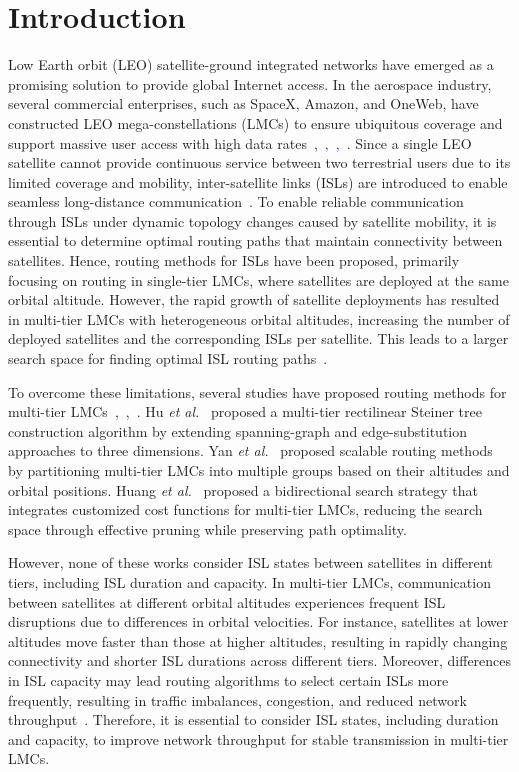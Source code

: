\section{Introduction}\label{sec:introduction}
Low Earth orbit (LEO) satellite-ground integrated networks have emerged as a promising solution to provide global Internet access. In the aerospace industry, several commercial enterprises, such as SpaceX, Amazon, and OneWeb, have constructed LEO mega-constellations (LMCs) to ensure ubiquitous coverage and support massive user access with high data rates~\cite{wang2022mega},~\cite{cao2025dense}\textcolor{blue}{,~\cite{he2024direct},~\cite{he2022multi}}.
Since a single LEO satellite cannot provide continuous service between two terrestrial users due to its limited coverage and mobility, inter-satellite links (ISLs) are introduced to enable seamless long-distance communication~\cite{mao2024intelligent}.
To enable reliable communication through ISLs under dynamic topology changes caused by satellite mobility, it is essential to determine optimal routing paths that maintain connectivity between satellites.
Hence, routing methods for ISLs have been proposed, primarily focusing on routing in single-tier LMCs, where satellites are deployed at the same orbital altitude.
However, the rapid growth of satellite deployments has resulted in multi-tier LMCs with heterogeneous orbital altitudes, increasing the number of deployed satellites and the corresponding ISLs per satellite. This leads to a larger search space for finding optimal ISL routing paths~\cite{luan2024fast}.


To overcome these limitations, several studies have proposed routing methods for multi-tier LMCs~\cite{hu2022software},~\cite{yan2024logic},~\cite{huang2026dynamic}.
Hu \textit{et al.}~\cite{hu2022software} proposed a multi-tier rectilinear Steiner tree construction algorithm by extending spanning-graph and edge-substitution approaches to three dimensions.
Yan \textit{et al.}~\cite{yan2024logic} proposed scalable routing methods by partitioning multi-tier LMCs into multiple groups based on their altitudes and orbital positions.
Huang \textit{et al.}~\cite{huang2026dynamic} proposed a bidirectional search strategy that integrates customized cost functions for multi-tier LMCs, reducing the search space through effective pruning while preserving path optimality.


However, none of these works consider ISL states between satellites in different tiers, including ISL duration and capacity.
In multi-tier LMCs, communication between satellites at different orbital altitudes experiences frequent ISL disruptions due to differences in orbital velocities. For instance, satellites at lower altitudes move faster than those at higher altitudes, resulting in rapidly changing connectivity and shorter ISL durations across different tiers.
Moreover, differences in ISL capacity may lead routing algorithms to select certain ISLs more frequently, resulting in traffic imbalances, congestion, and reduced network throughput~\cite{han2023time}.
Therefore, it is essential to consider ISL states, including duration and capacity, to improve network throughput for stable transmission in multi-tier LMCs.


